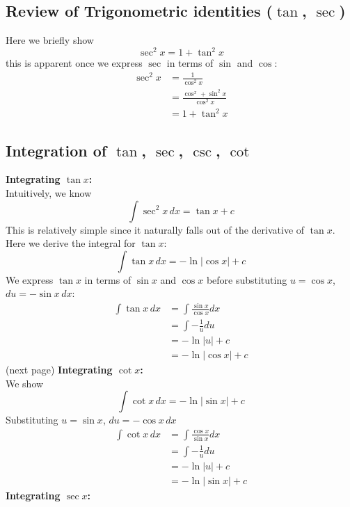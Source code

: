 \documentclass{report}
\begin{document}
\subsection{Review of Trigonometric identities ($\tan$, $\sec$)} %
Here we briefly show
\begin{equation*}
\sec^2x=1+\tan^2x
\end{equation*}
this is apparent once we express $\sec$ in terms of $\sin$ and $\cos$:
\begin{align*}
\sec^2x&=\frac{1}{\cos^2x}\\
&=\frac{\cos^x+\sin^2x}{\cos^2x}\\
&=1+\tan^2x
\end{align*}

\subsection{Integration of $\tan$, $\sec$, $\csc$, $\cot$} %
\textbf{Integrating $\tan x$:}\\
Intuitively, we know
\begin{equation*}
\int\sec^2x\,dx=\tan x+c
\end{equation*}
This is relatively simple since it naturally falls out of the
derivative of $\tan x$. Here we derive the integral for $\tan x$:
\begin{equation*}
\int\tan x\,dx=-\ln|\cos x|+c
\end{equation*}
We express $\tan x$ in terms of $\sin x$ and $\cos x$ before 
substituting $u=\cos x$, $du=-\sin x\,dx$:
\begin{align*}
\int\tan x\,dx&=\int\frac{\sin x}{\cos x}dx\\
&=\int-\frac{1}{u}du\\
&=-\ln|u|+c\\
&=-\ln|\cos x|+c
\end{align*}
(next page)
\newpage
\noindent\textbf{Integrating $\cot x$:}\\
We show
\begin{equation*}
\int\cot x\,dx=-\ln|\sin x|+c
\end{equation*}
Substituting $u=\sin x$, $du=-\cos x\,dx$
\begin{align*}
\int\cot x\,dx&=\int\frac{\cos x}{\sin x}dx\\
&=\int-\frac{1}{u}du\\
&=-\ln|u|+c\\
&=-\ln|\sin x|+c
\end{align*}
\textbf{Integrating $\sec x$:}\\
\end{document}
